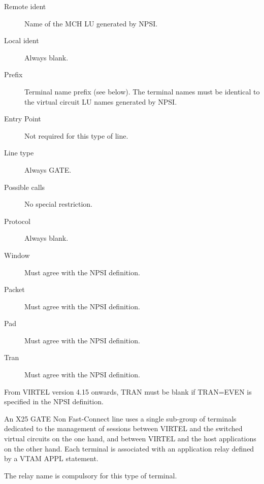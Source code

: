 \documentclass[letterpaper,10pt,english]{sphinxmanual}
\begin{document}
\begin{description}
\item[{Remote ident}] \leavevmode
Name of the MCH LU generated by NPSI.

\item[{Local ident}] \leavevmode
Always blank.

\item[{Prefix}] \leavevmode
Terminal name prefix (see below). The terminal names must be
identical to the virtual circuit LU names generated by NPSI.

\item[{Entry Point}] \leavevmode
Not required for this type of line.

\item[{Line type}] \leavevmode
Always GATE.

\item[{Possible calls}] \leavevmode
No special restriction.

\item[{Protocol}] \leavevmode
Always blank.

\item[{Window}] \leavevmode
Must agree with the NPSI definition.

\item[{Packet}] \leavevmode
Must agree with the NPSI definition.

\item[{Pad}] \leavevmode
Must agree with the NPSI definition.

\item[{Tran}] \leavevmode
Must agree with the NPSI definition.

\end{description}

From VIRTEL version 4.15 onwards, TRAN must be blank if TRAN=EVEN is specified in the NPSI definition.

An X25 GATE Non Fast-Connect line uses a single sub-group of terminals dedicated to the management of sessions between VIRTEL and the switched virtual circuits on the one hand, and between VIRTEL and the host applications on the other hand. Each terminal is associated with an application relay defined by a VTAM APPL statement.

The relay name is compulsory for this type of terminal.

\end{document}
